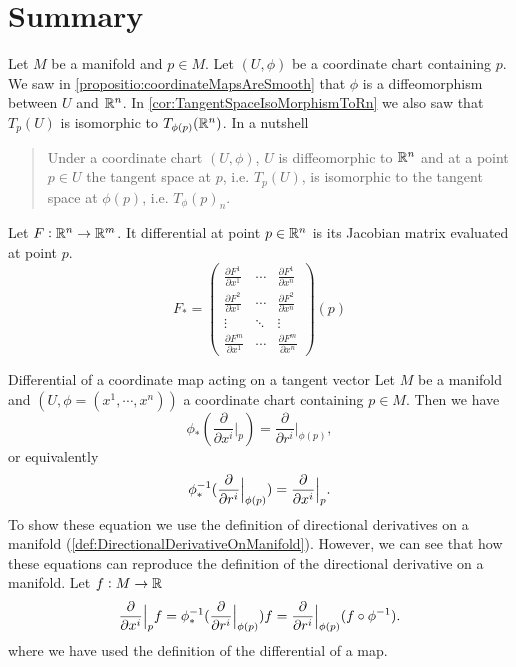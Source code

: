 \newpage

\section{Summary}
\begin{summary}
	Let $ M $ be a manifold and $ p \in M $. Let $ (U,\phi) $ be a coordinate chart containing $ p $. We saw in \autoref{propositio:coordinateMapsAreSmooth} that $ \phi $ is a diffeomorphism between $ U $ and $ \mathbb{R}^n $. In \autoref{cor:TangentSpaceIsoMorphismToRn} we also saw that $ T_p(U) $ is isomorphic to $ T_{\phi(p)}(\mathbb{R}^n) $. In a nutshell
	\begin{quote}
		Under a coordinate chart $ (U,\phi) $, $ U $ is diffeomorphic to $ \mathbb{R}^n $ and at a point $ p \in U $ the tangent space at $ p $, i.e. $ T_p(U) $, is isomorphic to the tangent space at $ \phi(p) $, i.e. $ T_\phi(p)_n $.
	\end{quote}
\end{summary}

\begin{summary}
	Let $ F: \mathbb{R}^n \to \mathbb{R}^m $. It differential at point $ p \in \mathbb{R}^n $ is its Jacobian matrix evaluated at point $ p $.
	\[ F_* = 
	\begin{pmatrix}
		\frac{\partial F^1}{\partial x^1} & \cdots & \frac{\partial F^1}{\partial x^n} \\
		\frac{\partial F^2}{\partial x^1} & \cdots & \frac{\partial F^2}{\partial x^n} \\
		\vdots & \ddots & \vdots \\
		\frac{\partial F^m}{\partial x^1} & \cdots & \frac{\partial F^m}{\partial x^n}
	\end{pmatrix}(p)
	 \]
\end{summary}

\begin{summary}{Differential of a coordinate map acting on a tangent vector}
	Let $ M $ be a manifold and $ (U,\phi = (x^1,\cdots,x^n)) $ a coordinate chart containing $ p \in M $. Then we have
	\[ \phi_*(\frac{\partial}{\partial  x^i}\big|_{p}) = \frac{\partial}{\partial  r^i}\big|_{\phi(p)} ,\]
	or equivalently
	\[ \phi_*^{-1}(\frac{\partial}{\partial  r^i}\big|_{\phi(p)}) = \frac{\partial}{\partial  x^i}\big|_{p}. \]
	To show these equation we use the definition of directional derivatives on a manifold (\autoref{def:DirectionalDerivativeOnManifold}). However, we can see that how these equations can reproduce the definition of the directional derivative on a manifold. Let $ f:M \to \mathbb{R} $
	\[ \frac{\partial}{\partial  x^i}\big|_{p} f = \phi_*^{-1}(\frac{\partial}{\partial  r^i}\big|_{\phi(p)})f = \frac{\partial}{\partial  r^i}\big|_{\phi(p)}(f\circ\phi^{-1}).  \]
	where we have used the definition of the differential of a map.
\end{summary}

